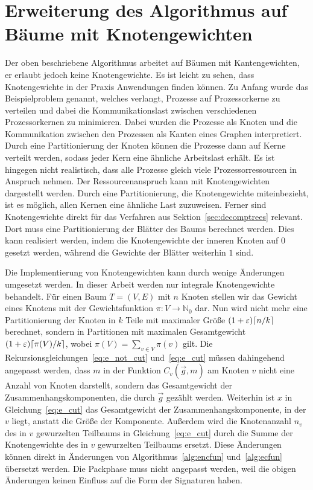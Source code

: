 \section{Erweiterung des Algorithmus auf Bäume mit Knotengewichten}\label{sec:nodeweights}
Der oben beschriebene Algorithmus arbeitet auf Bäumen mit Kantengewichten, er erlaubt jedoch keine Knotengewichte.
Es ist leicht zu sehen, dass Knotengewichte in der Praxis Anwendungen finden können.
Zu Anfang wurde das Beispielproblem genannt, welches verlangt, Prozesse auf Prozessorkerne zu verteilen und dabei die Kommunikationslast zwischen verschiedenen Prozessorkernen zu minimieren.
Dabei wurden die Prozesse als Knoten und die Kommunikation zwischen den Prozessen als Kanten eines Graphen interpretiert.
Durch eine Partitionierung der Knoten können die Prozesse dann auf Kerne verteilt werden, sodass jeder Kern eine ähnliche Arbeitslast erhält.
Es ist hingegen nicht realistisch, dass alle Prozesse gleich viele Prozessorressourcen in Anspruch nehmen.
Der Ressourcenanspruch kann mit Knotengewichten dargestellt werden. 
Durch eine Partitionierung, die Knotengewichte miteinbezieht, ist es möglich, allen Kernen eine ähnliche Last zuzuweisen.
Ferner sind Knotengewichte direkt für das Verfahren aus Sektion~\ref{sec:decomptrees} relevant. 
Dort muss eine Partitionierung der Blätter des Baums berechnet werden.
Dies kann realisiert werden, indem die Knotengewichte der inneren Knoten auf $0$ gesetzt werden, während die Gewichte der Blätter weiterhin $1$ sind.

Die Implementierung von Knotengewichten kann durch wenige Änderungen umgesetzt werden.
In dieser Arbeit werden nur integrale Knotengewichte behandelt.
Für einen Baum $T=(V,E)$ mit $n$ Knoten stellen wir das Gewicht eines Knotens mit der Gewichtsfunktion $\pi : V \rightarrow \mathbb{N}_0$ dar.
Nun wird nicht mehr eine Partitionierung der Knoten in $k$ Teile mit maximaler Größe $(1+\varepsilon) \lceil n/k\rceil$ berechnet, sondern in Partitionen mit maximalen Gesamtgewicht $(1+\varepsilon) \lceil\pi(V)/k\rceil$, wobei $\pi(V) = \sum_{v \in V} \pi(v)$ gilt.
Die Rekursionsgleichungen~\eqref{eq:e_not_cut} und~\eqref{eq:e_cut} müssen dahingehend angepasst werden, dass $m$ in der Funktion $C_v(\vec{g}, m)$ am Knoten $v$ nicht eine Anzahl von Knoten darstellt, sondern das Gesamtgewicht der Zusammenhangskomponenten, die durch $\vec{g}$ gezählt werden.
Weiterhin ist $x$ in Gleichung~\eqref{eq:e_cut} das Gesamtgewicht der Zusammenhangskomponente, in der $v$ liegt, anstatt die Größe der Komponente.
Außerdem wird die Knotenanzahl $n_v$ des in $v$ gewurzelten Teilbaums in Gleichung~\eqref{eq:e_cut} durch die Summe der Knotengewichte des in $v$ gewurzelten Teilbaums ersetzt.
Diese Änderungen können direkt in Änderungen von Algorithmus~\ref{alg:encfun} und~\ref{alg:ecfun} übersetzt werden.
Die Packphase muss nicht angepasst werden, weil die obigen Änderungen keinen Einfluss auf die Form der Signaturen haben.

